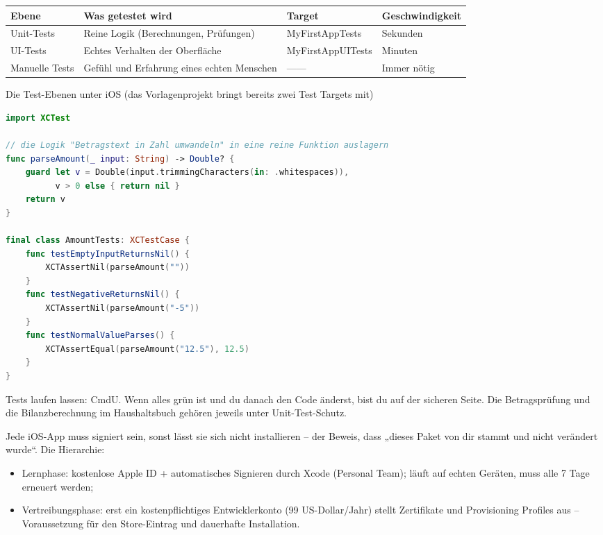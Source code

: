 \begin{center}
\begin{tabularx}{\linewidth}{|X|X|X|X|}
\hline
\textbf{Ebene} & \textbf{Was getestet wird} & \textbf{Target} & \textbf{Geschwindigkeit} \tabularnewline
\hline
Unit-Tests & Reine Logik (Berechnungen, Prüfungen) & MyFirstAppTests & Sekunden \tabularnewline
UI-Tests & Echtes Verhalten der Oberfläche & MyFirstAppUITests & Minuten \tabularnewline
Manuelle Tests & Gefühl und Erfahrung eines echten Menschen & —— & Immer nötig \tabularnewline
\hline
\end{tabularx}
\end{center}

\begin{center}\small\color{gray}Die Test-Ebenen unter iOS (das Vorlagenprojekt bringt bereits zwei Test Targets mit)\end{center}

\begin{lstlisting}[language=Swift]
import XCTest

// die Logik "Betragstext in Zahl umwandeln" in eine reine Funktion auslagern
func parseAmount(_ input: String) -> Double? {
    guard let v = Double(input.trimmingCharacters(in: .whitespaces)),
          v > 0 else { return nil }
    return v
}

final class AmountTests: XCTestCase {
    func testEmptyInputReturnsNil() {
        XCTAssertNil(parseAmount(""))
    }
    func testNegativeReturnsNil() {
        XCTAssertNil(parseAmount("-5"))
    }
    func testNormalValueParses() {
        XCTAssertEqual(parseAmount("12.5"), 12.5)
    }
}
\end{lstlisting}

Tests laufen lassen: CmdU. Wenn alles grün ist und du danach den Code änderst, bist du auf der sicheren Seite. Die Betragsprüfung und die Bilanzberechnung im Haushaltsbuch gehören jeweils unter Unit-Test-Schutz.


Jede iOS-App muss signiert sein, sonst lässt sie sich nicht installieren – der Beweis, dass „dieses Paket von dir stammt und nicht verändert wurde“. Die Hierarchie:

\begin{itemize}
  \item Lernphase: kostenlose Apple ID + automatisches Signieren durch Xcode (Personal Team); läuft auf echten Geräten, muss alle 7 Tage erneuert werden;
  \item Vertreibungsphase: erst ein kostenpflichtiges Entwicklerkonto (99 US-Dollar/Jahr) stellt Zertifikate und Provisioning Profiles aus – Voraussetzung für den Store-Eintrag und dauerhafte Installation.
\end{itemize}

